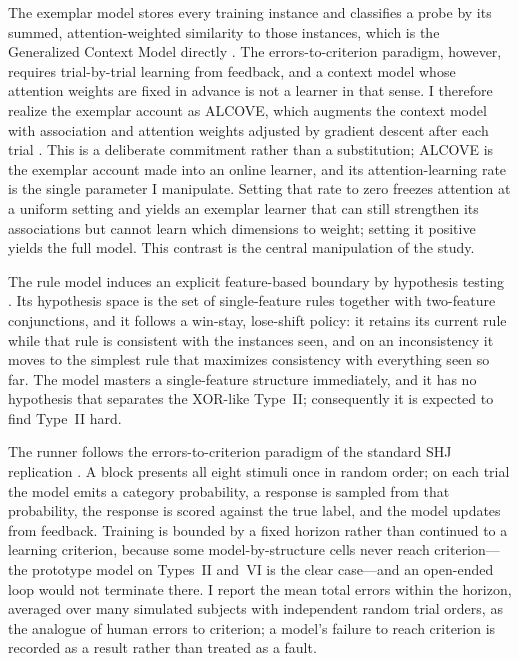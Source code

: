 \documentclass[conference]{IEEEtran}
\begin{document}
The exemplar model stores every training instance and classifies a probe by its
summed, attention-weighted similarity to those instances, which is the
Generalized Context Model directly \cite{medin1978,nosofsky1986}. The
errors-to-criterion paradigm, however, requires trial-by-trial learning from
feedback, and a context model whose attention weights are fixed in advance is not
a learner in that sense. I therefore realize the exemplar account as ALCOVE,
which augments the context model with association and attention weights adjusted
by gradient descent after each trial \cite{kruschke1992}. This is a deliberate
commitment rather than a substitution; ALCOVE is the exemplar account made into
an online learner, and its attention-learning rate is the single parameter I
manipulate. Setting that rate to zero freezes attention at a uniform setting and
yields an exemplar learner that can still strengthen its associations but cannot
learn which dimensions to weight; setting it positive yields the full model. This
contrast is the central manipulation of the study.

The rule model induces an explicit feature-based boundary by hypothesis testing
\cite{bruner1956}. Its hypothesis space is the set of single-feature rules
together with two-feature conjunctions, and it follows a win-stay, lose-shift
policy: it retains its current rule while that rule is consistent with the
instances seen, and on an inconsistency it moves to the simplest rule that
maximizes consistency with everything seen so far. The model masters a
single-feature structure immediately, and it has no hypothesis that separates the
XOR-like Type~II; consequently it is expected to find Type~II hard.

The runner follows the errors-to-criterion paradigm of the standard SHJ
replication \cite{nosofsky1994}. A block presents all eight stimuli once in
random order; on each trial the model emits a category probability, a response is
sampled from that probability, the response is scored against the true label, and
the model updates from feedback. Training is bounded by a fixed horizon rather
than continued to a learning criterion, because some model-by-structure cells
never reach criterion---the prototype model on Types~II and~VI is the clear
case---and an open-ended loop would not terminate there. I report the mean total
errors within the horizon, averaged over many simulated subjects with independent
random trial orders, as the analogue of human errors to criterion; a model's
failure to reach criterion is recorded as a result rather than treated as a
fault.
\end{document}
